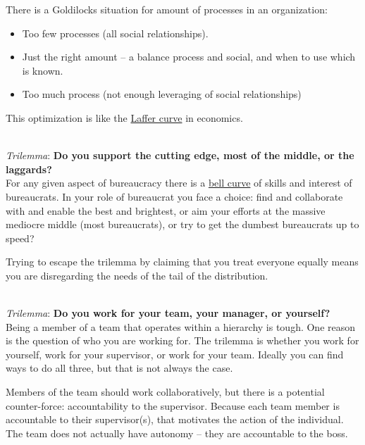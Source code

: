 There is a Goldilocks situation for amount of processes in an organization:
\begin{itemize}
    \item Too few processes (all social relationships).
    \item Just the right amount -- a balance process and social, and when to use which is known.
    \item Too much process (not enough leveraging of social relationships)
\end{itemize}
This optimization is like the \href{https://en.wikipedia.org/wiki/Laffer_curve}{Laffer curve} in economics.

\ \\

\textit{Trilemma}: \textbf{Do you support the cutting edge, most of the middle, or the laggards?}\\
For any given aspect of bureaucracy there is a \href{https://en.wikipedia.org/wiki/Normal_distribution}{bell curve} of skills and interest of bureaucrats. In your role of bureaucrat you face a choice: find and collaborate with and enable the best and brightest, or aim your efforts at the massive mediocre middle (most bureaucrats), or try to get the dumbest bureaucrats up to speed? 

Trying to escape the trilemma by claiming that you treat everyone equally means you are disregarding the needs of the tail of the distribution. 

\ \\

\textit{Trilemma}: \textbf{Do you work for your team, your manager, or yourself?} \\
Being a member of a team that operates within a hierarchy is tough. One reason is the question of who you are working for. The trilemma is whether you work for yourself, work for your supervisor, or work for your team.  Ideally you can find ways to do all three, but that is not always the case. 

Members of the team should work collaboratively, but there is a potential counter-force: accountability to the supervisor. Because each team member is accountable to their supervisor(s), that motivates the action of the individual. The team does not actually have autonomy -- they are accountable to the boss.

